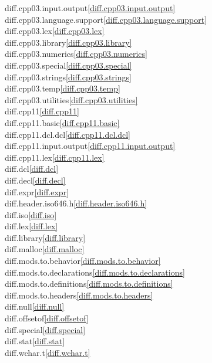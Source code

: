 \begin{multicols}{2}
diff.cpp03.input.output\quad\ref{diff.cpp03.input.output}\\
diff.cpp03.language.support\quad\ref{diff.cpp03.language.support}\\
diff.cpp03.lex\quad\ref{diff.cpp03.lex}\\
diff.cpp03.library\quad\ref{diff.cpp03.library}\\
diff.cpp03.numerics\quad\ref{diff.cpp03.numerics}\\
diff.cpp03.special\quad\ref{diff.cpp03.special}\\
diff.cpp03.strings\quad\ref{diff.cpp03.strings}\\
diff.cpp03.temp\quad\ref{diff.cpp03.temp}\\
diff.cpp03.utilities\quad\ref{diff.cpp03.utilities}\\
diff.cpp11\quad\ref{diff.cpp11}\\
diff.cpp11.basic\quad\ref{diff.cpp11.basic}\\
diff.cpp11.dcl.dcl\quad\ref{diff.cpp11.dcl.dcl}\\
diff.cpp11.input.output\quad\ref{diff.cpp11.input.output}\\
diff.cpp11.lex\quad\ref{diff.cpp11.lex}\\
diff.dcl\quad\ref{diff.dcl}\\
diff.decl\quad\ref{diff.decl}\\
diff.expr\quad\ref{diff.expr}\\
diff.header.iso646.h\quad\ref{diff.header.iso646.h}\\
diff.iso\quad\ref{diff.iso}\\
diff.lex\quad\ref{diff.lex}\\
diff.library\quad\ref{diff.library}\\
diff.malloc\quad\ref{diff.malloc}\\
diff.mods.to.behavior\quad\ref{diff.mods.to.behavior}\\
diff.mods.to.declarations\quad\ref{diff.mods.to.declarations}\\
diff.mods.to.definitions\quad\ref{diff.mods.to.definitions}\\
diff.mods.to.headers\quad\ref{diff.mods.to.headers}\\
diff.null\quad\ref{diff.null}\\
diff.offsetof\quad\ref{diff.offsetof}\\
diff.special\quad\ref{diff.special}\\
diff.stat\quad\ref{diff.stat}\\
diff.wchar.t\quad\ref{diff.wchar.t}\\

\end{multicols}
